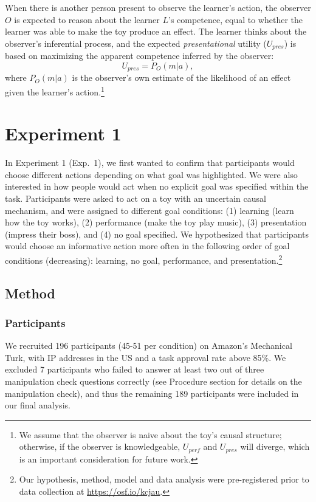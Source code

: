 \documentclass[10pt, letterpaper]{article}
\begin{document}
When there is another person present to observe the learner's action,
the observer \(O\) is expected to reason about the learner \(L\)'s
competence, equal to whether the learner was able to make the toy
produce an effect. The learner thinks about the observer's inferential
process, and the expected \emph{presentational} utility (\(U_{pres}\))
is based on maximizing the apparent competence inferred by the observer:
\[ U_{pres} = P_O(m | a),\] \noindent
where \(P_O(m | a)\) is the observer's own estimate of the likelihood of
an effect given the learner's action.\footnote{We assume that the
  observer is naive about the toy's causal structure; otherwise, if the
  observer is knowledgeable, \(U_{perf}\) and \(U_{pres}\) will diverge,
  which is an important consideration for future work.}

\section{Experiment 1}\label{experiment-1}

In Experiment 1 (Exp.~1), we first wanted to confirm that participants
would choose different actions depending on what goal was highlighted.
We were also interested in how people would act when no explicit goal
was specified within the task. Participants were asked to act on a toy
with an uncertain causal mechanism, and were assigned to different goal
conditions: (1) learning (learn how the toy works), (2) performance
(make the toy play music), (3) presentation (impress their boss), and
(4) no goal specified. We hypothesized that participants would choose an
informative action more often in the following order of goal conditions
(decreasing): learning, no goal, performance, and
presentation.\footnote{Our hypothesis, method, model and data analysis were pre-registered prior to data collection at \url{https://osf.io/kcjau}.}

\subsection{Method}\label{method}

\subsubsection{Participants}\label{participants}

We recruited 196 participants (45-51 per condition) on Amazon's
Mechanical Turk, with IP addresses in the US and a task approval rate
above 85\%. We excluded 7 participants who failed to answer at least two
out of three manipulation check questions correctly (see Procedure
section for details on the manipulation check), and thus the remaining
189 participants were included in our final analysis.
\end{document}
